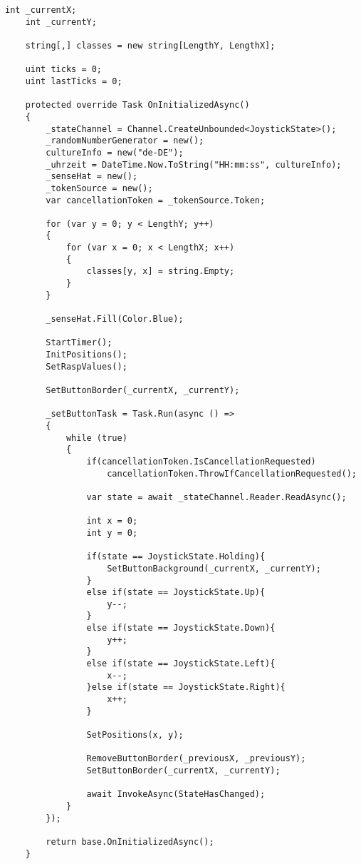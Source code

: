 \begin{lstlisting}[language={[Sharp]C}, caption=Kompletter Demo Code,
	label=lst:DemoCode]
    int _currentX;
    int _currentY;

    string[,] classes = new string[LengthY, LengthX];

    uint ticks = 0;
    uint lastTicks = 0;

    protected override Task OnInitializedAsync()
    {
        _stateChannel = Channel.CreateUnbounded<JoystickState>();
        _randomNumberGenerator = new();
        cultureInfo = new("de-DE");
        _uhrzeit = DateTime.Now.ToString("HH:mm:ss", cultureInfo);
        _senseHat = new();
        _tokenSource = new();
        var cancellationToken = _tokenSource.Token;

        for (var y = 0; y < LengthY; y++)
        {
            for (var x = 0; x < LengthX; x++)
            {
                classes[y, x] = string.Empty;
            }
        }

        _senseHat.Fill(Color.Blue);

        StartTimer();
        InitPositions();
        SetRaspValues();

        SetButtonBorder(_currentX, _currentY);

        _setButtonTask = Task.Run(async () =>
        {
            while (true)
            {
                if(cancellationToken.IsCancellationRequested)
                    cancellationToken.ThrowIfCancellationRequested();

                var state = await _stateChannel.Reader.ReadAsync();

                int x = 0;
                int y = 0;

                if(state == JoystickState.Holding){
                    SetButtonBackground(_currentX, _currentY);
                }
                else if(state == JoystickState.Up){
                    y--;
                }
                else if(state == JoystickState.Down){
                    y++;
                }
                else if(state == JoystickState.Left){
                    x--;
                }else if(state == JoystickState.Right){
                    x++;
                }

                SetPositions(x, y);

                RemoveButtonBorder(_previousX, _previousY);
                SetButtonBorder(_currentX, _currentY);

                await InvokeAsync(StateHasChanged);
            }
        });

        return base.OnInitializedAsync();
    }


\end{lstlisting}
